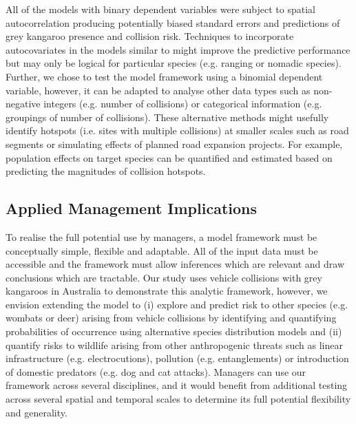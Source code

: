 All of the models with binary dependent variables were subject to spatial autocorrelation producing potentially biased standard errors and predictions of grey kangaroo presence and collision risk. Techniques to incorporate autocovariates in the models similar to \cite{cras12} might improve the predictive performance but may only be logical for particular species (e.g. ranging or nomadic species). Further, we chose to test the model framework using a binomial dependent variable, however, it can be adapted to analyse other data types such as non-negative integers (e.g. number of collisions) or categorical information (e.g. groupings of number of collisions). These alternative methods might usefully identify hotspots (i.e. sites with multiple collisions) at smaller scales such as road segments or simulating effects of planned road expansion projects. For example, population effects on target species can be quantified and estimated based on predicting the magnitudes of collision hotspots.
 
\subsection{Applied Management Implications}
To realise the full potential use by managers, a model framework must be conceptually simple, flexible and adaptable. All of the input data must be accessible and the framework must allow inferences which are relevant and draw conclusions which are tractable. Our study uses vehicle collisions with grey kangaroos in Australia to demonstrate this analytic framework, however, we envision extending the model to (i) explore and predict risk to other species (e.g. wombats or deer) arising from vehicle collisions by identifying and quantifying probabilities of occurrence using alternative species distribution models and (ii) quantify risks to wildlife arising from other anthropogenic threats such as linear infrastructure (e.g. electrocutions), pollution (e.g. entanglements) or introduction of domestic predators (e.g. dog and cat attacks). Managers can use our framework across several disciplines, and it would benefit from additional testing across several spatial and temporal scales to determine its full potential flexibility and generality.